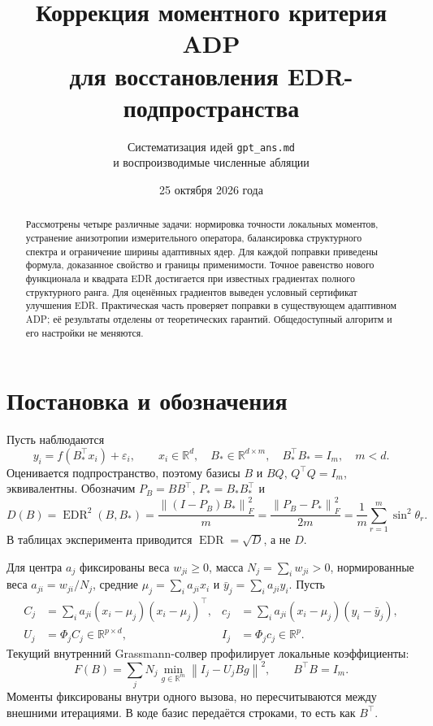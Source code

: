 \documentclass[11pt,a4paper]{article}
\title{Коррекция моментного критерия ADP\\для восстановления EDR-подпространства}
\author{Систематизация идей \texttt{gpt\_ans.md}\\и воспроизводимые численные абляции}
\date{25 октября 2026 года}
\newcommand{\R}{\mathbb R}
\newcommand{\norm}[1]{\left\lVert#1\right\rVert}
\newcommand{\EDR}{\operatorname{EDR}}
\begin{document}
\maketitle
\begin{abstract}
Рассмотрены четыре различные задачи: нормировка точности локальных
моментов, устранение анизотропии измерительного оператора, балансировка
структурного спектра и ограничение ширины адаптивных ядер. Для каждой
поправки приведены формула, доказанное свойство и границы применимости.
Точное равенство нового функционала и квадрата EDR достигается при известных
градиентах полного структурного ранга. Для оценённых градиентов выведен
условный сертификат улучшения EDR. Практическая часть проверяет поправки
в существующем адаптивном ADP; её результаты отделены от теоретических
гарантий. Общедоступный алгоритм и его настройки не меняются.
\end{abstract}
\tableofcontents

\section{Постановка и обозначения}
Пусть наблюдаются
\[
 y_i=f(B_*^\top x_i)+\varepsilon_i,\qquad x_i\in\R^d,\quad
 B_*\in\R^{d\times m},\quad B_*^\top B_*=I_m,\quad m<d.
\]
Оценивается подпространство, поэтому базисы $B$ и $BQ$, $Q^\top Q=I_m$,
эквивалентны. Обозначим $P_B=BB^\top$, $P_*=B_*B_*^\top$ и
\begin{equation}\label{eq:edr}
 D(B)=\EDR^2(B,B_*)=\frac{\norm{(I-P_B)B_*}_F^2}{m}
 =\frac{\norm{P_B-P_*}_F^2}{2m}
 =\frac1m\sum_{r=1}^m\sin^2\theta_r.
\end{equation}
В таблицах эксперимента приводится $\EDR=\sqrt D$, а не $D$.

Для центра $a_j$ фиксированы веса $w_{ji}\ge0$, масса $N_j=\sum_iw_{ji}>0$,
нормированные веса $a_{ji}=w_{ji}/N_j$, средние
$\mu_j=\sum_i a_{ji}x_i$ и $\bar y_j=\sum_i a_{ji}y_i$. Пусть
\begin{align}
 C_j&=\sum_i a_{ji}(x_i-\mu_j)(x_i-\mu_j)^\top,&
 c_j&=\sum_i a_{ji}(x_i-\mu_j)(y_i-\bar y_j),\nonumber\\
 U_j&=\Phi_j C_j\in\R^{p\times d},&
 I_j&=\Phi_j c_j\in\R^p.\label{eq:moments}
\end{align}
Текущий внутренний Grassmann-солвер профилирует локальные коэффициенты:
\begin{equation}\label{eq:base}
 F(B)=\sum_j N_j\min_{g\in\R^m}\norm{I_j-U_jBg}^2,
 \qquad B^\top B=I_m.
\end{equation}
Моменты фиксированы внутри одного вызова, но пересчитываются между
внешними итерациями. В коде базис передаётся строками, то есть как $B^\top$.
\end{document}
